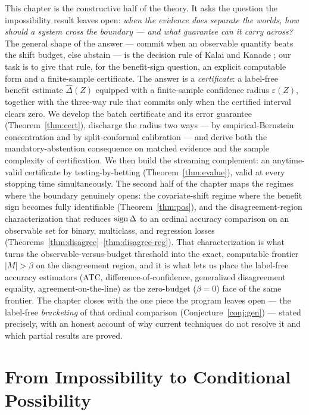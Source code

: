 This chapter is the constructive half of the theory. It asks the question the
impossibility result leaves open: \emph{when the evidence does separate the worlds, how
should a system cross the boundary --- and what guarantee can it carry across?} The
general shape of the answer --- commit when an observable quantity beats the shift
budget, else abstain --- is the decision rule of Kalai and Kanade
\cite{kalai2021abstain}; our task is to give that rule, for the benefit-sign question,
an explicit computable form and a finite-sample certificate. The answer is a
\emph{certificate}: a label-free benefit estimate $\widehat\Delta(Z)$ equipped with a
finite-sample confidence radius $\varepsilon(Z)$, together with the three-way rule that
commits only when the certified interval clears zero. We develop the batch certificate
and its error guarantee (Theorem~\ref{thm:cert}), discharge the radius two ways --- by
empirical-Bernstein concentration and by split-conformal calibration --- and derive
both the mandatory-abstention consequence on matched evidence and the sample complexity
of certification. We then build the streaming complement: an anytime-valid certificate
by testing-by-betting (Theorem~\ref{thm:evalue}), valid at every stopping time
simultaneously. The second half of the chapter maps the regimes where the boundary
genuinely opens: the covariate-shift regime where the benefit sign becomes fully
identifiable (Theorem~\ref{thm:pos}), and the disagreement-region characterization that
reduces $\operatorname{sign}\Delta$ to an ordinal accuracy comparison on an observable set for binary,
multiclass, and regression losses (Theorems~\ref{thm:disagree}--\ref{thm:disagree-reg}).
That characterization is what turns the observable-versus-budget threshold into the
exact, computable frontier $|M|>\beta$ on the disagreement region, and it is what lets us
place the label-free accuracy estimators (ATC, difference-of-confidence, generalized
disagreement equality, agreement-on-the-line) as the zero-budget ($\beta=0$) face of the
same frontier. The chapter closes with the one piece the program leaves open --- the
label-free \emph{bracketing} of that ordinal comparison (Conjecture~\ref{conj:gen}) ---
stated precisely, with an honest account of why current techniques do not resolve it and
which partial results are proved.

\section{From Impossibility to Conditional Possibility}
\label{sec:t2-idea}

